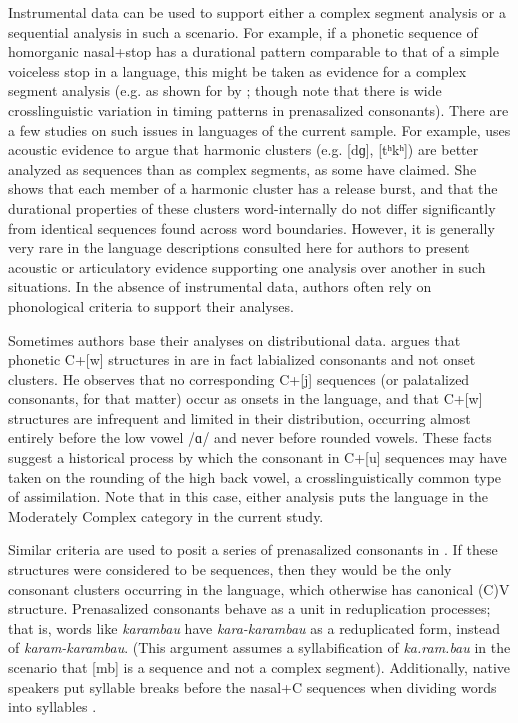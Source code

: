   Instrumental data can be used to support either a complex segment analysis or a sequential analysis in such a scenario. For example, if a phonetic sequence of homorganic nasal+stop has a durational pattern comparable to that of a simple voiceless stop in a language, this might be taken as evidence for a complex segment analysis (e.g. as shown for  by \citealt{Maddieson1989a}; though \citealt{LadefogedMaddieson1996} note that there is wide crosslinguistic variation in timing patterns in prenasalized consonants). There are a few studies on such issues in languages of the current sample. For example, \citet{Chitoran1998} uses acoustic evidence to argue that  harmonic clusters (e.g. [dɡ], [tʰkʰ]) are better analyzed as sequences than as complex segments, as some have claimed. She shows that each member of a harmonic cluster has a release burst, and that the durational properties of these clusters word-internally do not differ significantly from identical sequences found across word boundaries. However, it is generally very rare in the language descriptions consulted here for authors to present acoustic or articulatory evidence supporting one analysis over another in such situations. In the absence of instrumental data, authors often rely on phonological criteria to support their analyses.

  Sometimes authors base their analyses on distributional data. \citet[135--138]{Erickson2001} argues that phonetic C+[w] structures in  are in fact labialized consonants and not onset clusters. He observes that no corresponding C+[j] sequences (or palatalized consonants, for that matter) occur as onsets in the language, and that C+[w] structures are infrequent and limited in their distribution, occurring almost entirely before the low vowel /ɑ/ and never before rounded vowels. These facts suggest a historical process by which the consonant in C+[u] sequences may have taken on the rounding of the high back vowel, a crosslinguistically common type of assimilation. Note that in this case, either analysis puts the language in the Moderately Complex category in the current study.

  Similar criteria are used to posit a series of prenasalized consonants in . If these structures were considered to be sequences, then they would be the only consonant clusters occurring in the language, which otherwise has canonical (C)V structure. Prenasalized consonants behave as a unit in reduplication processes; that is, words like \textit{karambau} have \textit{kara-karambau} as a reduplicated form, instead of \textit{karam-karambau}. (This argument assumes a syllabification of \textit{ka.ram.bau} in the scenario that [mb] is a sequence and not a complex segment). Additionally, native speakers put syllable breaks before the nasal+C sequences when dividing words into syllables \citep[30-31]{Donohue1999}. 

